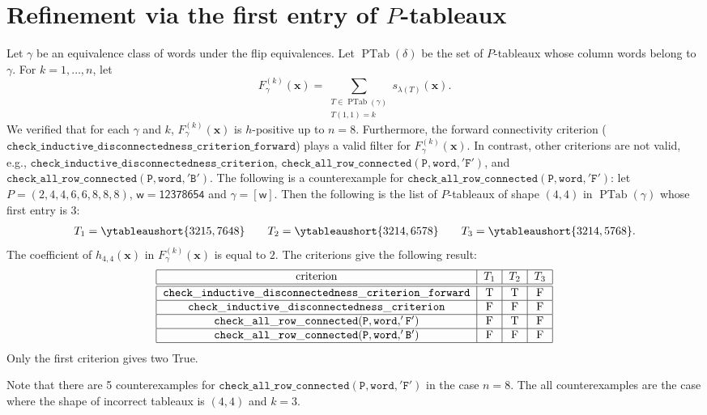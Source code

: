 \documentclass[11pt,reqno]{amsart}
\theoremstyle{definition}
\theoremstyle{remark}
\numberwithin{equation}{section}
\newcommand\xx{\mathbf{x}}
\newcommand\ww{\mathsf{w}}
\newcommand\PTab{\operatorname{PTab}}
\begin{document}
\section{Refinement via the first entry of \( P \)-tableaux}
Let \( \gamma \) be an equivalence class of words under the flip equivalences.
Let \( \PTab(\delta) \) be the set of \( P \)-tableaux whose column words belong to \( \gamma \).
For \( k=1,\dots, n \), let
\[
  F_{\gamma}^{(k)}(\xx) = \sum_{\substack{T\in\PTab(\gamma) \\ T(1,1)=k}} s_{\lambda(T)}(\xx).
\]
We verified that for each \( \gamma \) and \( k \), \( F_\gamma^{(k)}(\xx) \) is \( h \)-positive
up to \( n=8 \).
Furthermore, the forward connectivity criterion
(\( \mathtt{check\_inductive\_disconnectedness\_criterion\_forward} \)) plays a valid filter
for \( F_\gamma^{(k)}(\xx) \).
In contrast, other criterions are not valid, e.g.,
\( \mathtt{check\_inductive\_disconnectedness\_criterion} \),
\( \mathtt{check\_all\_row\_connected(P, word, 'F')} \), and
\( \mathtt{check\_all\_row\_connected(P, word, 'B')} \).
The following is a counterexample for \( \mathtt{check\_all\_row\_connected(P, word, 'F')} \):
let \( P= (2, 4, 4, 6, 6, 8, 8, 8) \), \( \ww = \mathsf{12378654} \) and \( \gamma=[\ww] \).
Then the following is the list of \( P \)-tableaux of shape \( (4,4) \) in \( \PTab(\gamma) \)
whose first entry is \( 3 \):
\begin{align*}
  T_1 = \ytableaushort{3215,7648}\qquad
  T_2 = \ytableaushort{3214,6578}\qquad
  T_3 = \ytableaushort{3214,5768}.
\end{align*}
The coefficient of \( h_{4,4}(\xx) \) in \( F_\gamma^{(k)}(\xx) \) is equal to \( 2 \).
The criterions give the following result:
\[
  \begin{tabular}{|c|c|c|c|}
    \hline
    criterion & \( T_1 \) & \( T_2 \) & \( T_3 \) \\
    \hline \hline
    \( \mathtt{check\_inductive\_disconnectedness\_criterion\_forward} \) & T & T & F \\
    \hline
    \( \mathtt{check\_inductive\_disconnectedness\_criterion} \) & F & F & F \\
    \hline
    \( \mathtt{check\_all\_row\_connected(P, word, 'F')} \) & F & T & F \\
    \hline
    \( \mathtt{check\_all\_row\_connected(P, word, 'B')} \) & F & F & F \\
    \hline
  \end{tabular}
\]
Only the first criterion gives two True.

Note that there are 5 counterexamples for \( \mathtt{check\_all\_row\_connected(P, word, 'F')} \)
in the case \( n=8 \). The all counterexamples are the case where the shape of incorrect tableaux
is \( (4,4) \) and \( k = 3 \).
\end{document}
